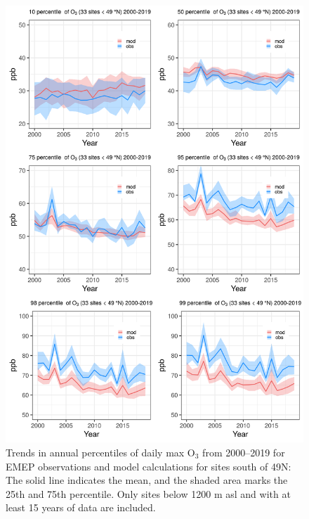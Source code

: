 \begin{figure}[h]
	\centering
	\includegraphics[width=0.74\paperwidth]{FIGS_TRENDS/alltrends_south_49_2000_2019_1200m.png}
	\caption{\label{fig:O3_perctrends_S}Trends in annual percentiles of daily max O$_3$ from 2000--2019 for EMEP observations and model calculations for sites south of 49\degrees N: The solid line indicates the mean, and the shaded area marks the 25th and 75th percentile. Only sites below 1200 m asl and with at least 15 years of data are included.}
\end{figure}

